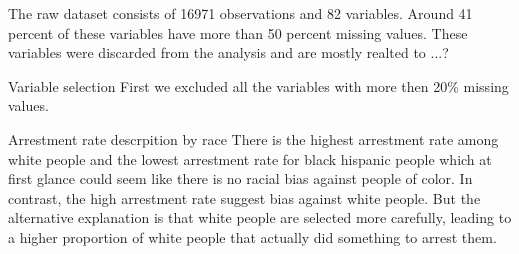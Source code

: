 The raw dataset consists of 16971 observations and 82 variables. Around 41 percent
of these variables have more than 50 percent missing values. These variables
were discarded from the analysis and are mostly realted to ...?

Variable selection
First we excluded all the variables with more then 20\% missing values. 



Arrestment rate descrpition by race
There is the highest arrestment rate among white people and the lowest arrestment rate for black hispanic people
which at first glance could seem like there is no racial bias against people of color. In contrast, the high arrestment rate
suggest bias against white people. But the alternative explanation is that white people are selected more carefully,
leading to a higher proportion of white people that actually did something to arrest them.